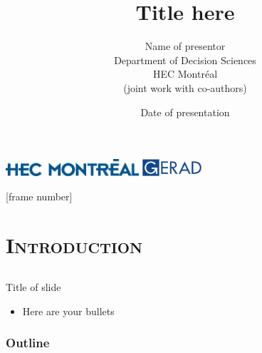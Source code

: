 \documentclass[xcolor=x11names,compress]{beamer}
\renewcommand{\(}{\begin{columns}}
\renewcommand{\)}{\end{columns}}
\newcommand{\<}[1]{\begin{column}{#1}}
\renewcommand{\>}{\end{column}}
\newcommand{\0}{\V{0}}
\newcommand{\1}{\V{1}}
\begin{document}
\begin{frame}

\centering
\title{Title here}
\subtitle{}
\author{
Name of presentor\\
Department of Decision Sciences\\
HEC Montr\'{e}al\\
\vspace{0.5 cm}
	{\small (joint work with co-authors)}\\
}
\date{
	Date of presentation
}
\titlepage
 \includegraphics[height=0.25in]{HEC_Montreal_541.eps}\hspace{0.3\textwidth} \includegraphics[height=0.25in]{gerad-vector-logo2.png}

\end{frame}
[frame number]



\section[Introduction]{\scshape Introduction}
\subsection[ ]{\scshape  }



\begin{frame}{Title of slide}

\begin{itemize}
\item Here are your bullets
\end{itemize} 


\end{frame}
   
 

   \begin{frame}
        \frametitle{Outline}
\tableofcontents[hidesubsections]
   \end{frame}
\end{document}
